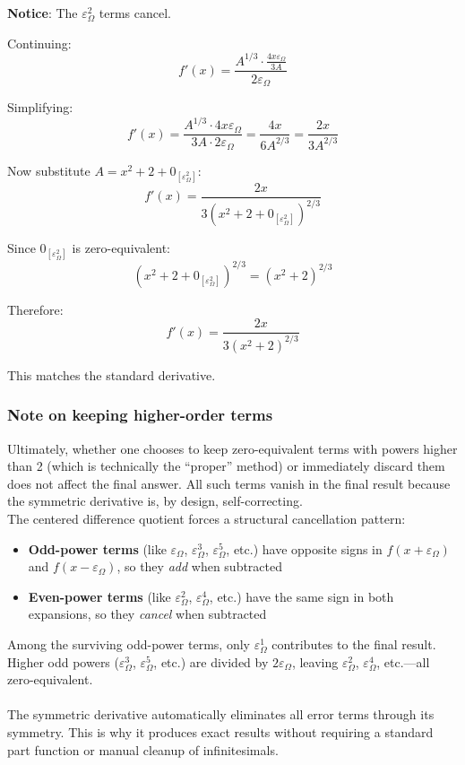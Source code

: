 \documentclass{article}
\begin{document}
\textbf{Notice}: The $\varepsilon_\Omega^2$ terms cancel.

Continuing:
$$f'(x) = \frac{A^{1/3} \cdot \frac{4x\varepsilon_\Omega}{3A}}{2\varepsilon_\Omega}$$

Simplifying:
$$f'(x) = \frac{A^{1/3} \cdot 4x\varepsilon_\Omega}{3A \cdot 2\varepsilon_\Omega} = \frac{4x}{6A^{2/3}} = \frac{2x}{3A^{2/3}}$$

Now substitute $A = x^2 + 2 + 0_{[\varepsilon_\Omega^2]}$:
$$f'(x) = \frac{2x}{3(x^2 + 2 + 0_{[\varepsilon_\Omega^2]})^{2/3}}$$

Since $0_{[\varepsilon_\Omega^2]}$ is zero-equivalent:
$$(x^2 + 2 + 0_{[\varepsilon_\Omega^2]})^{2/3} = (x^2 + 2)^{2/3}$$

Therefore:
$$f'(x) = \frac{2x}{3(x^2 + 2)^{2/3}}$$

This matches the standard derivative.

\subsubsection{Note on keeping higher-order terms}

Ultimately, whether one chooses to keep zero-equivalent terms with powers higher than 2 (which is technically the ``proper'' method) or immediately discard them does not affect the final answer. All such terms vanish in the final result because the symmetric derivative is, by design, self-correcting.\\The centered difference quotient forces a structural cancellation pattern:
\begin{itemize}
\item \textbf{Odd-power terms} (like $\varepsilon_\Omega$, $\varepsilon_\Omega^3$, $\varepsilon_\Omega^5$, etc.) have opposite signs in $f(x + \varepsilon_\Omega)$ and $f(x - \varepsilon_\Omega)$, so they \textit{add} when subtracted
\item \textbf{Even-power terms} (like $\varepsilon_\Omega^2$, $\varepsilon_\Omega^4$, etc.) have the same sign in both expansions, so they \textit{cancel} when subtracted
\end{itemize}Among the surviving odd-power terms, only $\varepsilon_\Omega^1$ contributes to the final result. Higher odd powers ($\varepsilon_\Omega^3$, $\varepsilon_\Omega^5$, etc.) are divided by $2\varepsilon_\Omega$, leaving $\varepsilon_\Omega^2$, $\varepsilon_\Omega^4$, etc.—all zero-equivalent.\\\\The symmetric derivative automatically eliminates all error terms through its symmetry. This is why it produces exact results without requiring a standard part function or manual cleanup of infinitesimals.
\end{document}
